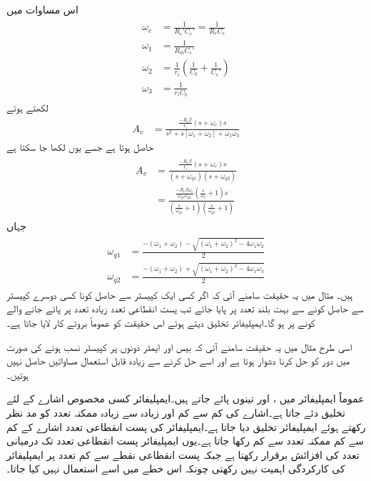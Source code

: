 اس مساوات میں
\begin{gather}
\begin{aligned}
\omega_c &=\frac{1}{R_e'  C_e' }=\frac{1}{R_e C_e}\\
\omega_1 &=\frac{1}{R_m C_e'}\\
\omega_2 &=\frac{1}{r_i} \left(\frac{1}{C_b}+\frac{1}{ C_e'} \right)\\
\omega_3 &=\frac{1}{r_i C_b}
\end{aligned}
\end{gather}
لکھتے ہوئے
\begin{align*}
A_v&=\frac{\frac{-R_c \beta}{r_i}\left(s+\omega_c\right) s}{s^2+s \left[\omega_1+\omega_2\right] +\omega_1 \omega_3}
\end{align*}
حاصل ہوتا ہے جسے یوں لکھا جا سکتا ہے
\begin{gather}
\begin{aligned}
A_v&=\frac{\frac{-R_c \beta}{r_i}\left(s+\omega_c\right) s}{\left(s+\omega_{q1} \right) \left(s+\omega_{q2} \right)}\\
&=\frac{\frac{-R_c \beta \omega_c}{\omega_{q1} \omega_{q2}} \left(\frac{s}{\omega_c}+1 \right) s}{\left(\frac{s}{\omega_{q1}}+1 \right)\left(\frac{s}{\omega_{q2}}+1 \right)}
\end{aligned}
\end{gather}
جہاں
\begin{gather}
\begin{aligned}
\omega_{q1}&= \frac{-\left(\omega_1+\omega_2 \right) - \sqrt{\left(\omega_1+\omega_2 \right)^2 -4 \omega_1 \omega_3}}{2}\\
\omega_{q2}&= \frac{-\left(\omega_1+\omega_2 \right) + \sqrt{\left(\omega_1+\omega_2 \right)^2 -4 \omega_1 \omega_3}}{2}
\end{aligned}
\end{gather}
ہیں۔
مثال  میں یہ حقیقت سامنے آئی کہ اگر کسی ایک کپیسٹر سے حاصل  کونا  کسی دوسرے کپیسٹر سے حاصل  کونے سے بہت بلند تعدد پر پایا جائے تب پست انقطاعی تعدد زیادہ تعدد پر پائے جانے والے کونے پر ہو گا۔ایمپلیفائر تخلیق دیتے ہوئے اس حقیقت کو عموماً بروئے کار لایا جاتا ہے۔

اسی طرح مثال  میں یہ حقیقت سامنے آئی کہ بیس  اور ایمٹر دونوں پر کپیسٹر نسب ہونے کی صورت میں دور کو حل کرنا دشوار ہوتا ہے اور اسے حل کرنے سے زیادہ قابل استعمال مساواتیں حاصل نہیں ہوتیں۔

عموماً ایمپلیفائر میں ،  اور  تینوں پائے جاتے ہیں۔ایمپلیفائر کسی مخصوص اشارے کے لئے تخلیق دئے جاتا ہے۔اشارے کی کم سے کم اور زیادہ سے زیادہ ممکنہ تعدد کو مد نظر رکھتے ہوئے ایمپلیفائر تخلیق دیا جاتا ہے۔ایمپلیفائر کی پست انقطاعی تعدد اشارے کے کم سے کم ممکنہ تعدد سے کم رکھا جاتا ہے۔یوں ایمپلیفائر پست انقطاعی تعدد تک درمیانی تعدد کی افزائش برقرار رکھتا ہے جبکہ پست انقطاعی نقطے  سے کم تعدد پر ایمپلیفائر کی کارکردگی اہمیت نہیں رکھتی چونکہ اس خطے میں اسے استعمال نہیں کیا جاتا۔

